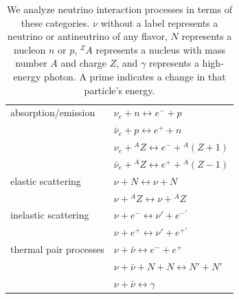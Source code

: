 \documentclass[aps,floatfix,prd,superscriptaddress,twocolumn]{revtex4-1}
\begin{document}
\begin{table}%
  \caption{
    We analyze neutrino interaction processes in terms of these categories.
    $\nu$ without a label represents a neutrino or antineutrino of any flavor,
    $N$ represents a nucleon $n$ or $p$,
    ${}^ZA$ represents a nucleus with mass number $A$ and charge $Z$, and
    $\gamma$ represents a high-energy photon.
    A prime indicates a change in that particle's energy.
  }
  \label{tab:neutrino_processes}
  \begin{tabularx}{\columnwidth}{X X}
    \hline \hline
    absorption/emission
    & $\nu_e + n \leftrightarrow e^- + p$                          \\
    & $\bar{\nu}_e + p \leftrightarrow e^+ + n$                    \\
    & $\nu_e + {}^AZ \leftrightarrow e^- + {}^A(Z+1)$              \\
    & $\bar{\nu}_e + {}^AZ \leftrightarrow e^+ + {}^A(Z-1)$        \\
    \hline
    elastic scattering
    & $\nu + N \leftrightarrow \nu + N$                            \\
    & $\nu + {}^AZ \leftrightarrow \nu + {}^AZ$                    \\
    \hline
    inelastic scattering
    & $\nu + e^- \leftrightarrow \nu' + e^{-'}$                    \\
    & $\nu + e^+ \leftrightarrow \nu' + e^{+'}$                    \\
    \hline
    thermal pair processes
    & $\nu + \bar{\nu} \leftrightarrow e^{-} + e^{+}$              \\
    & $\nu + \bar{\nu} + N + N \leftrightarrow N' + N'$            \\
    & $\nu + \bar{\nu} \leftrightarrow \gamma$                     \\
    \hline \hline
  \end{tabularx}
\end{table}
\end{document}
